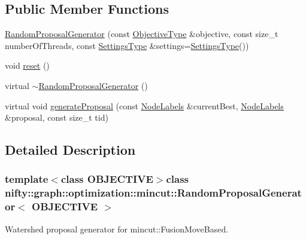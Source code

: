 \subsection*{Public Member Functions}
\begin{DoxyCompactItemize}
\item 
\hyperlink{classnifty_1_1graph_1_1optimization_1_1mincut_1_1RandomProposalGenerator_aecb4d9d62aea7e24704a5c72a1bf293d}{Random\+Proposal\+Generator} (const \hyperlink{classnifty_1_1graph_1_1optimization_1_1mincut_1_1RandomProposalGenerator_a22d8486d3e63bd7770c0c8f91b1a7886}{Objective\+Type} \&objective, const size\+\_\+t number\+Of\+Threads, const \hyperlink{structnifty_1_1graph_1_1optimization_1_1mincut_1_1RandomProposalGenerator_1_1SettingsType}{Settings\+Type} \&settings=\hyperlink{structnifty_1_1graph_1_1optimization_1_1mincut_1_1RandomProposalGenerator_1_1SettingsType}{Settings\+Type}())
\item 
void \hyperlink{classnifty_1_1graph_1_1optimization_1_1mincut_1_1RandomProposalGenerator_af3c9840ac19c3ddba6216bd2c938af91}{reset} ()
\item 
virtual \hyperlink{classnifty_1_1graph_1_1optimization_1_1mincut_1_1RandomProposalGenerator_a47472f329bfedf3628327759a36ccd7d}{$\sim$\+Random\+Proposal\+Generator} ()
\item 
virtual void \hyperlink{classnifty_1_1graph_1_1optimization_1_1mincut_1_1RandomProposalGenerator_a2b23eb074a247b63fa79fd3076888417}{generate\+Proposal} (const \hyperlink{classnifty_1_1graph_1_1optimization_1_1mincut_1_1ProposalGeneratorBase_a7d708f82cab20149a88eefada79a23b0}{Node\+Labels} \&current\+Best, \hyperlink{classnifty_1_1graph_1_1optimization_1_1mincut_1_1ProposalGeneratorBase_a7d708f82cab20149a88eefada79a23b0}{Node\+Labels} \&proposal, const size\+\_\+t tid)
\end{DoxyCompactItemize}


\subsection{Detailed Description}
\subsubsection*{template$<$class O\+B\+J\+E\+C\+T\+I\+V\+E$>$class nifty\+::graph\+::optimization\+::mincut\+::\+Random\+Proposal\+Generator$<$ O\+B\+J\+E\+C\+T\+I\+V\+E $>$}

Watershed proposal generator for mincut\+::\+Fusion\+Move\+Based. 


